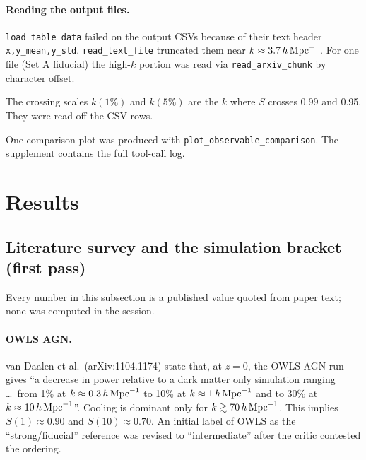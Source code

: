 \documentclass[11pt,a4paper]{article}
\begin{document}
\paragraph{Reading the output files.} \texttt{load\_table\_data} failed on the output CSVs because of their text header \texttt{x,y\_mean,y\_std}. \texttt{read\_text\_file} truncated them near $k\approx3.7\,h\,{\rm Mpc}^{-1}$. For one file (Set A fiducial) the high-$k$ portion was read via \texttt{read\_arxiv\_chunk} by character offset.

The crossing scales $k(1\%)$ and $k(5\%)$ are the $k$ where $S$ crosses 0.99 and 0.95. They were read off the CSV rows.

One comparison plot was produced with \texttt{plot\_observable\_comparison}. The supplement contains the full tool-call log.

\section{Results}
\subsection{Literature survey and the simulation bracket (first pass)}
Every number in this subsection is a published value quoted from paper text; none was computed in the session.

\paragraph{OWLS AGN.} van Daalen et al.\ (arXiv:1104.1174) state that, at $z=0$, the OWLS AGN run gives ``a decrease in power relative to a dark matter only simulation ranging \ldots\ from 1\% at $k\approx0.3\,h\,{\rm Mpc}^{-1}$ to 10\% at $k\approx1\,h\,{\rm Mpc}^{-1}$ and to 30\% at $k\approx10\,h\,{\rm Mpc}^{-1}$''. Cooling is dominant only for $k\gtrsim70\,h\,{\rm Mpc}^{-1}$. This implies $S(1)\approx0.90$ and $S(10)\approx0.70$. An initial label of OWLS as the ``strong/fiducial'' reference was revised to ``intermediate'' after the critic contested the ordering.
\end{document}
